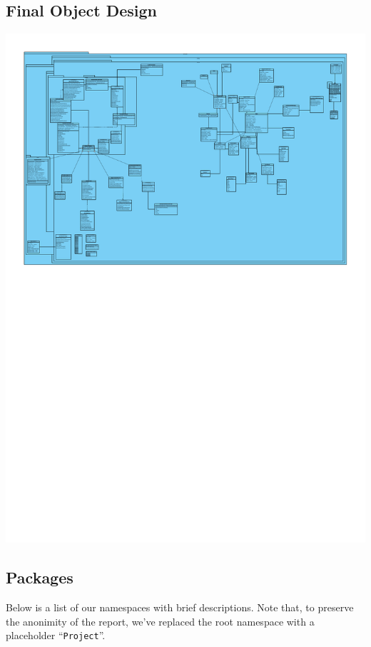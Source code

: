 \documentclass[a4paper, 12pt, titlepage]{article}
\begin{document}
  \subsection{Final Object Design}

  \includegraphics[width=\linewidth]{finalobject}

  \subsection{Packages}

  Below is a list of our namespaces with brief descriptions.
  Note that, to preserve the anonimity of the report, we've replaced the root namespace with a placeholder ``\texttt{Project}''.
\end{document}
